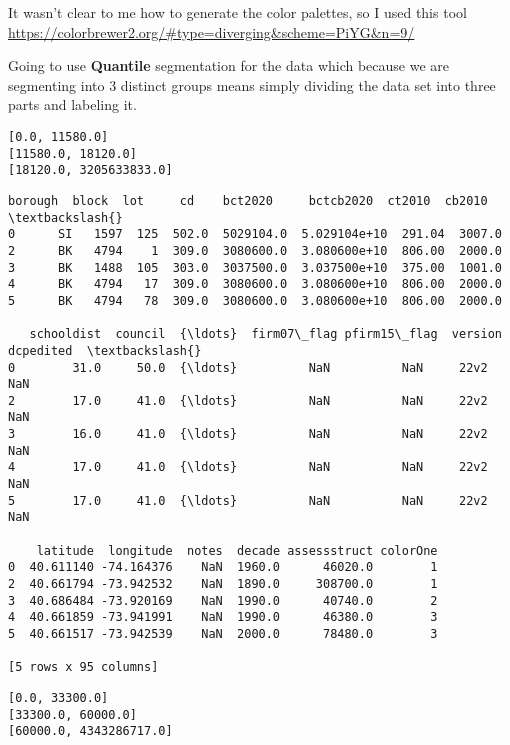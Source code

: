 \documentclass[11pt]{article}
\begin{document}
    It wasn't clear to me how to generate the color palettes, so I used this
tool \url{https://colorbrewer2.org/\#type=diverging\&scheme=PiYG\&n=9/}

    Going to use \textbf{Quantile} segmentation for the data which because
we are segmenting into 3 distinct groups means simply dividing the data
set into three parts and labeling it.

    \begin{Verbatim}[commandchars=\\\{\}]
[0.0, 11580.0]
[11580.0, 18120.0]
[18120.0, 3205633833.0]
    \end{Verbatim}

            \begin{tcolorbox}[breakable, size=fbox, boxrule=.5pt, pad at break*=1mm, opacityfill=0]
\begin{Verbatim}[commandchars=\\\{\}]
  borough  block  lot     cd    bct2020     bctcb2020  ct2010  cb2010  \textbackslash{}
0      SI   1597  125  502.0  5029104.0  5.029104e+10  291.04  3007.0
2      BK   4794    1  309.0  3080600.0  3.080600e+10  806.00  2000.0
3      BK   1488  105  303.0  3037500.0  3.037500e+10  375.00  1001.0
4      BK   4794   17  309.0  3080600.0  3.080600e+10  806.00  2000.0
5      BK   4794   78  309.0  3080600.0  3.080600e+10  806.00  2000.0

   schooldist  council  {\ldots}  firm07\_flag pfirm15\_flag  version  dcpedited  \textbackslash{}
0        31.0     50.0  {\ldots}          NaN          NaN     22v2        NaN
2        17.0     41.0  {\ldots}          NaN          NaN     22v2        NaN
3        16.0     41.0  {\ldots}          NaN          NaN     22v2        NaN
4        17.0     41.0  {\ldots}          NaN          NaN     22v2        NaN
5        17.0     41.0  {\ldots}          NaN          NaN     22v2        NaN

    latitude  longitude  notes  decade assessstruct colorOne
0  40.611140 -74.164376    NaN  1960.0      46020.0        1
2  40.661794 -73.942532    NaN  1890.0     308700.0        1
3  40.686484 -73.920169    NaN  1990.0      40740.0        2
4  40.661859 -73.941991    NaN  1990.0      46380.0        3
5  40.661517 -73.942539    NaN  2000.0      78480.0        3

[5 rows x 95 columns]
\end{Verbatim}
\end{tcolorbox}
        
    \begin{Verbatim}[commandchars=\\\{\}]
[0.0, 33300.0]
[33300.0, 60000.0]
[60000.0, 4343286717.0]
    \end{Verbatim}
\end{document}

